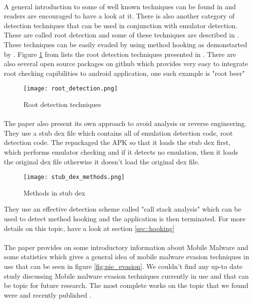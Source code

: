 \documentclass[../main.tex]{subfile}
\begin{document}
	\paragraph{} A general introduction to some of well known techniques can be found in \cite{geist2016jailbreak} and readers are encouraged to have a look at it. There is also another category of detection techniques that can be used in conjunction with emulator detection. These are called root detection and some of these techniques are described in \cite{sun2015android}. These techniques can be easily evaded by using method hooking as demonstarted by \cite{lim2016android}. Figure \ref{fig:root_detection} from \cite{lim2016android} lists the root detection techniques presented in \cite{sun2015android}. There are also several open source packages on github which provides very easy to integrate root checking capibilities to android application, one such example is "root beer" \cite{rootbeer}
	
	\begin{figure}
		\texttt{[image: root\_detection.png]}
		\caption{Root detection techniques \cite{lim2016android} \cite{sun2015android}}
		\label{fig:root_detection}			
	\end{figure}

	\paragraph{} The paper \cite{lim2016android} also present its own approach to avoid analysis or reverse engineering. They use a stub dex file which contains all of emulation detection code, root detection code. The repackaged the APK so that it loads the stub dex first, which performs emulator checking and if it detects no emulation, then it loads the original dex file otherwise it doesn't load the original dex file.
	\begin{figure}
		\texttt{[image: stub\_dex\_methods.png]}
		\caption{Methods in stub dex \cite{lim2016android}}
		\label{fig:stub_dex_methods}			
	\end{figure}
	They use an effective detection scheme called "call stack analysis" which can be used to detect method hooking and the application is then terminated. For more details on this topic, have a look at section \ref{sec::hooking}


	\paragraph{} The paper \cite{amro2018malware} provides on some introductory information about Mobile Malware and some statistics which gives a general idea of mobile malware evasion techniques in use that can be seen in figure \ref{fig:pie_evasion}. We couldn't find any up-to date study discussing Mobile malware evasion techniques currently in use and that can be topic for future research.  The most complete works on the topic that we found were \cite{vidas2014evading} and recently published \cite{ares}.
	
\end{document}
